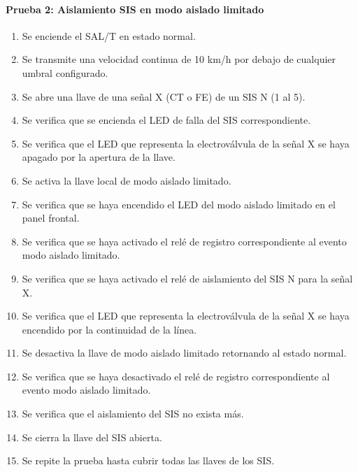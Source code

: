 \paragraph{Prueba 2: Aislamiento SIS en modo aislado limitado}
\begin{enumerate}
\item	Se enciende el SAL/T en estado normal.
\item	Se transmite una velocidad continua de 10 km/h por debajo de cualquier umbral configurado.
\item	Se abre una llave de una señal X (CT o FE) de un SIS N (1 al 5).
\item	Se verifica que se encienda el LED de falla del SIS correspondiente.
\item	Se verifica que el LED que representa la electroválvula de la señal X se haya apagado por la apertura de la llave.
\item	Se activa la llave local de modo aislado limitado.
\item	Se verifica que se haya encendido el LED del modo aislado limitado en el panel frontal.
\item	Se verifica que se haya activado el relé de registro correspondiente al evento modo aislado limitado.
\item	Se verifica que se haya activado el relé de aislamiento del SIS N para la señal X.
\item	Se verifica que el LED que representa la electroválvula de la señal X se haya encendido por la continuidad de la línea.
\item	Se desactiva la llave de modo aislado limitado retornando al estado normal.
\item	Se verifica que se haya desactivado el relé de registro correspondiente al evento modo aislado limitado.
\item	Se verifica que el aislamiento del SIS no exista más.
\item	Se cierra la llave del SIS abierta.
\item	Se repite la prueba hasta cubrir todas las llaves de los SIS.

\end{enumerate}


